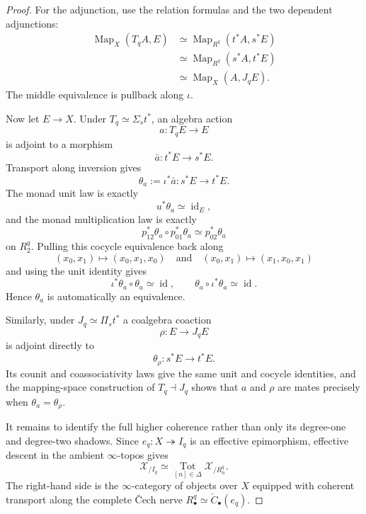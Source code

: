 \begin{proof}
For the adjunction, use the relation formulas and the two dependent
adjunctions:
\[
\begin{aligned}
    \operatorname{Map}_X(T_qA,E)
    &\simeq
    \operatorname{Map}_{R^q}(t^*A,s^*E)\\
    &\simeq
    \operatorname{Map}_{R^q}(s^*A,t^*E)\\
    &\simeq
    \operatorname{Map}_X(A,J_qE).
\end{aligned}
\]
The middle equivalence is pullback along $\iota$.

Now let $E\to X$.  Under $T_q\simeq\Sigma_s t^*$, an algebra action
\[
    a:T_qE\longrightarrow E
\]
is adjoint to a morphism
\[
    \bar a:t^*E\longrightarrow s^*E.
\]
Transport along inversion gives
\[
    \theta_a:=\iota^*\bar a:
    s^*E\longrightarrow t^*E.
\]
The monad unit law is exactly
\[
    u^*\theta_a\simeq\operatorname{id}_E,
\]
and the monad multiplication law is exactly
\[
    p_{12}^*\theta_a\circ p_{01}^*\theta_a
    \simeq
    p_{02}^*\theta_a
\]
on $R^q_2$.  Pulling this cocycle equivalence back along
\[
    (x_0,x_1)\longmapsto(x_0,x_1,x_0)
    \quad\text{and}\quad
    (x_0,x_1)\longmapsto(x_1,x_0,x_1)
\]
and using the unit identity gives
\[
    \iota^*\theta_a\circ\theta_a\simeq\operatorname{id},
    \qquad
    \theta_a\circ\iota^*\theta_a\simeq\operatorname{id}.
\]
Hence $\theta_a$ is automatically an equivalence.

Similarly, under $J_q\simeq\Pi_s t^*$ a coalgebra coaction
\[
    \rho:E\longrightarrow J_qE
\]
is adjoint directly to
\[
    \theta_\rho:s^*E\longrightarrow t^*E.
\]
Its counit and coassociativity laws give the same unit and cocycle identities,
and the mapping-space construction of $T_q\dashv J_q$ shows that $a$ and
$\rho$ are mates precisely when $\theta_a=\theta_\rho$.

It remains to identify the full higher coherence rather than only its
degree-one and degree-two shadows.  Since
$e_q:X\twoheadrightarrow I_q$ is an effective epimorphism, effective descent
in the ambient $\infty$-topos gives
\[
    \mathcal X_{/I_q}
    \simeq
    \operatorname*{Tot}_{[n]\in\Delta}
    \mathcal X_{/R^q_n}.
\]
The right-hand side is the $\infty$-category of objects over $X$ equipped with
coherent transport along the complete \v{C}ech nerve
$R^q_\bullet\simeq\check C_\bullet(e_q)$.


\end{proof}

